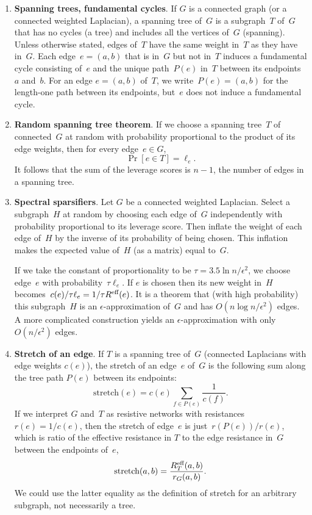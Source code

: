 \documentclass[11pt]{article}
\newcommand{\stretchh}{\mbox{stretch}}
\newcommand{\Reff}{R^{\mbox{\scriptsize eff}}}  %
\begin{document}
\begin{enumerate}
\item{\bf Spanning trees, fundamental cycles}.\label{stree}
If $G$ is a connected graph (or a connected weighted Laplacian),
a spanning tree of~$G$ is a subgraph~$T$ of~$G$ that has
no cycles (a tree) and includes all the vertices of~$G$ (spanning).
Unless otherwise stated, 
edges of~$T$ have the same weight in~$T$ as they have in~$G$.
Each edge~$e=(a,b)$ that is in~$G$ but not in~$T$ induces a
fundamental cycle consisting of~$e$ and the unique path~$P(e)$
in~$T$ between its endpoints~$a$ and~$b$.
For an edge $e=(a,b)$ of~$T$, we write~$P(e)=(a,b)$ 
for the length-one path between its endpoints, 
but~$e$ does not induce a fundamental cycle.

\item{\bf Random spanning tree theorem}.\label{rtree}
If we choose a spanning tree~$T$ of connected~$G$ at random 
with probability proportional to the product of its edge weights, 
then for every edge~$e\in G$,
$$\Pr[e\in T] = \ell_e.$$
It follows that the sum of the leverage scores is $n-1$,
the number of edges in a spanning tree.

\item{\bf Spectral sparsifiers}.
Let $G$ be a connected weighted Laplacian.
Select a subgraph~$H$ at random by choosing each edge
of~$G$ independently with probability proportional to its leverage score.
Then inflate the weight of each edge of~$H$ 
by the inverse of its probability of being chosen.
This inflation makes the expected value of~$H$ (as a matrix) equal to~$G$.

If we take the constant of proportionality to be $\tau=3.5\ln n/\epsilon^2$,
we choose edge~$e$ with probability~$\tau\ell_e$.
If $e$ is chosen then its new weight in~$H$ 
becomes~$c(e)/\tau\ell_e = 1/\tau\Reff(e)$.
It is a theorem that (with high probability) this subgraph~$H$ 
is an $\epsilon$-approximation of~$G$ and has $O(n\log n/\epsilon^2)$ edges.
A more complicated construction yields an $\epsilon$-approximation
with only $O(n/\epsilon^2)$ edges.

\item{\bf Stretch of an edge}.
If $T$ is a spanning tree of~$G$ 
(connected Laplacians with edge weights $c(e)$),
the stretch of an edge~$e$ of~$G$ is the following sum along the
tree path $P(e)$ between its endpoints:
$$\stretchh(e) = c(e)\sum_{f\in P(e)}\frac{1}{c(f)}.$$
If we interpret $G$ and~$T$ as resistive networks
with resistances $r(e) = 1/c(e)$, 
then the stretch of edge~$e$ is just~$r(P(e))/r(e)$,
which is ratio of the effective resistance in $T$ to the
edge resistance in~$G$ between the endpoints of~$e$,
$$\stretchh(a,b) = \frac{\Reff_T(a,b)}{r_G(a,b)}.$$
We could use the latter equality as the definition of stretch
for an arbitrary subgraph, not necessarily a tree.


\end{enumerate}
\end{document}
